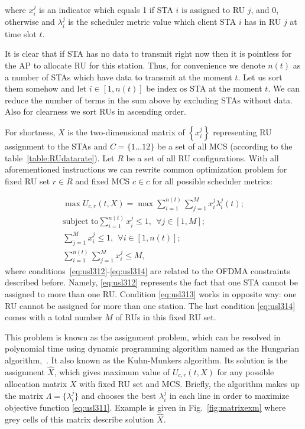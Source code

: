 where $x_i^j$ is an indicator which equals 1 if STA $i$ is assigned to RU $j$, and 0, otherwise and $\lambda_i^j$ is the scheduler metric value which client STA $i$ has in RU $j$ at time slot $t$. 

It is clear that if STA has no data to transmit right now then it is pointless for the AP to allocate RU for this station. Thus, for convenience we denote $n(t)$ as a number of STAs which have data to transmit at the moment $t$. Let us sort them somehow and let $i\in[1, n(t)]$ be index os STA at the moment $t$. We can reduce the number of terms in the sum above by excluding STAs without data. Also for clearness we sort RUs in ascending order.

For shortness, $X$ is the two-dimensional matrix of $\left\{x_i^j\right\}$ representing RU assignment to the STAs and $C = \{1\dots12\}$ be a set of all MCS (according to the table~\ref{table:RUdatarate}). Let $R$ be a set of all RU configurations. With all aforementioned instructions we can rewrite common optimization problem for fixed RU set $r \in R$ and fixed MCS $c \in c$ for all possible scheduler metrics:

\begin{align} \label{eq:usl311}
\max U_{c, r}(t,X) = \max \sum^{n(t)}_{i = 1} \sum_{j = 1}^{M} x_i^j \lambda_i^j(t); \\ \label{eq:usl312}
\text{subject to} \sum_{i=1}^{n(t)} x_i^j \leq 1,\ \  \forall j \in [1,M]; \\ \label{eq:usl313}
\sum_{j = 1}^{M} x_i^j \leq 1, \ \ \forall i \in [1, n(t)]; \\ \label{eq:usl314}
\sum_{i = 1}^{n(t)} \sum_{j = 1}^{M} x_i^j \leq M,
\end{align}
where conditions~\eqref{eq:usl312}-\eqref{eq:usl314} are related to the OFDMA  constraints described before. 
Namely, \eqref{eq:usl312} represents the fact that one STA cannot be assigned to more than one RU. Condition \eqref{eq:usl313} works in opposite way: one RU cannot be assigned for more than one station. The last condition \eqref{eq:usl314} comes with a total number $M$ of RUs in this fixed RU set.

This problem is known as the assignment problem, which can be resolved in polynomial time using dynamic programming algorithm named as the Hungarian algorithm,~\cite{bourgeois1971extension}.
It also known as the Kuhn-Munkers algorithm. 
Its solution is the assignment $\hat X$, which gives maximum value of $U_{c, r}(t,X)$  for any possible allocation matrix $X$ with fixed RU set and MCS. 
Briefly, the algorithm makes up the matrix $\Lambda = \{\lambda_i^j\}$ and chooses the best $\lambda_i^j$ in each line in order to maximize objective function \ref{eq:usl311}. Example is given in Fig.~\ref{fig:matrixexm} where grey cells of this matrix describe solution $\hat X$. 

